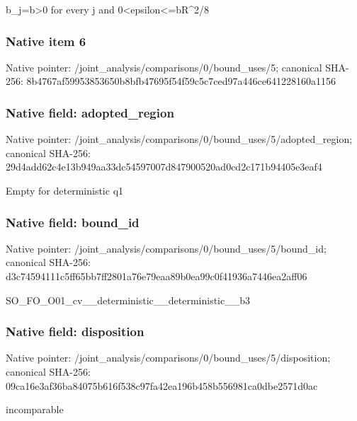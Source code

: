\documentclass[10pt,a4paper]{article}
\begin{document}
\begingroup\raggedright\sloppy b\_\allowbreak{}j=\allowbreak{}b>0 for every j and 0<epsilon<=\allowbreak{}bR\textasciicircum{}2/\allowbreak{}8\par\endgroup

\subsubsection{Native item 6}
Native pointer: /joint\_\allowbreak{}analysis/comparisons/0/bound\_\allowbreak{}uses/5; canonical SHA-256: 8b4767af59953853650b8bfb47695f54f59c5c7ced97a446ce641228160a1156

\subsubsection{Native field: adopted\_\allowbreak{}region}
Native pointer: /joint\_\allowbreak{}analysis/comparisons/0/bound\_\allowbreak{}uses/5/adopted\_\allowbreak{}region; canonical SHA-256: 29d4add62c4e13b949aa33dc54597007d847900520ad0cd2c171b94405e3eaf4

\begingroup\raggedright\sloppy Empty for deterministic q1\par\endgroup

\subsubsection{Native field: bound\_\allowbreak{}id}
Native pointer: /joint\_\allowbreak{}analysis/comparisons/0/bound\_\allowbreak{}uses/5/bound\_\allowbreak{}id; canonical SHA-256: d3c74594111c5ff65bb7ff2801a76e79eaa89b0ea99c0f41936a7446ea2aff06

\begingroup\raggedright\sloppy SO\_\allowbreak{}FO\_\allowbreak{}O01\_\allowbreak{}cv\_\allowbreak{}\_\allowbreak{}deterministic\_\allowbreak{}\_\allowbreak{}deterministic\_\allowbreak{}\_\allowbreak{}b3\par\endgroup

\subsubsection{Native field: disposition}
Native pointer: /joint\_\allowbreak{}analysis/comparisons/0/bound\_\allowbreak{}uses/5/disposition; canonical SHA-256: 09ca16e3af36ba84075b616f538c97fa42ea196b458b556981ca0dbe2571d0ac

\begingroup\raggedright\sloppy incomparable\par\endgroup
\end{document}
